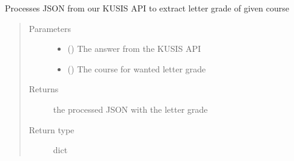 \documentclass[letterpaper,10pt,english]{sphinxmanual}
\begin{document}

\begin{fulllineitems}
\label{\detokenize{DialogFlow_Bridge_API:DialogFlow_Bridge_API.getLetterGrade}}
\pysigstartsignatures
{}
\pysigstopsignatures
\sphinxAtStartPar
Processes JSON from our KUSIS API to extract letter grade of given course
\begin{quote}\begin{description}
\item[{Parameters}] \leavevmode\begin{itemize}
\item {} 
\sphinxAtStartPar
{} () \textendash{} The answer from the KUSIS API

\item {} 
\sphinxAtStartPar
{} () \textendash{} The course for wanted letter grade

\end{itemize}

\item[{Returns}] \leavevmode
\sphinxAtStartPar
the processed JSON with the letter grade

\item[{Return type}] \leavevmode
\sphinxAtStartPar
dict

\end{description}\end{quote}

\end{fulllineitems}

\end{document}
